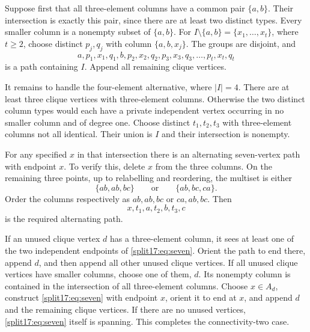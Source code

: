\documentclass[11pt,a4paper]{article}
\theoremstyle{definition}\newtheorem{definition}[theorem]{Definition}
\theoremstyle{remark}\newtheorem{remark}[theorem]{Remark}
\begin{document}
Suppose first that all three-element columns have a common pair $\{a,b\}$.
Their intersection is exactly this pair, since there are at least two
distinct types. Every smaller column is a nonempty subset of $\{a,b\}$.
For $I\setminus\{a,b\}=\{x_1,\ldots,x_t\}$, where $t\ge2$, choose distinct
$p_j,q_j$ with column $\{a,b,x_j\}$. The groups are disjoint, and
\[
 a,p_1,x_1,q_1,b,p_2,x_2,q_2,p_3,x_3,q_3,\ldots,p_t,x_t,q_t
\]
is a path containing $I$. Append all remaining clique vertices.

It remains to handle the four-element alternative, where $|I|=4$.
There are at least three clique vertices with three-element columns.
Otherwise the two distinct column types would each have a private
independent vertex occurring in no smaller column and of degree one.
Choose distinct $t_1,t_2,t_3$ with three-element columns not all identical.
Their union is $I$ and their intersection is nonempty.

For any specified $x$ in that intersection there is an alternating
seven-vertex path with endpoint $x$. To verify this, delete $x$ from the
three columns. On the remaining three points, up to relabelling and
reordering, the multiset is either
\[
 \{ab,ab,bc\}\qquad\text{or}\qquad\{ab,bc,ca\}.
\]
Order the columns respectively as $ab,ab,bc$ or $ca,ab,bc$. Then
\begin{equation}\label{split17:eq:seven}
 x,t_1,a,t_2,b,t_3,c
\end{equation}
is the required alternating path.

If an unused clique vertex $d$ has a three-element column, it sees at
least one of the two independent endpoints of \eqref{split17:eq:seven}. Orient
the path to end there, append $d$, and then append all other unused clique
vertices. If all unused clique vertices have smaller columns, choose one
of them, $d$. Its nonempty column is contained in the intersection of all
three-element columns. Choose $x\in A_d$, construct \eqref{split17:eq:seven} with
endpoint $x$, orient it to end at $x$, and append $d$ and the remaining
clique vertices. If there are no unused vertices, \eqref{split17:eq:seven} itself
is spanning. This completes the connectivity-two case.
\end{document}
